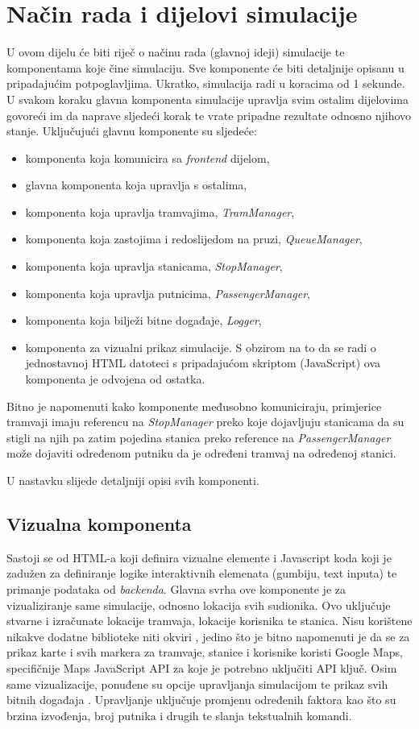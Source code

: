 \documentclass[times, utf8, diplomski]{fer}
\begin{document}
\section{Način rada i dijelovi simulacije}
U ovom dijelu će biti riječ o načinu rada (glavnoj ideji) simulacije te komponentama koje čine simulaciju. Sve komponente će biti detaljnije opisanu u pripadajućim potpoglavljima.
Ukratko, simulacija radi u koracima od 1 sekunde. U svakom koraku glavna komponenta simulacije upravlja svim ostalim dijelovima govoreći im da naprave sljedeći korak te vrate pripadne rezultate odnosno njihovo stanje. Uključujući glavnu komponente su sljedeće:
\begin{itemize}
    \item komponenta koja komunicira sa \emph{frontend} dijelom,
    \item glavna komponenta koja upravlja s ostalima,
    \item komponenta koja upravlja tramvajima, \emph{TramManager},
    \item komponenta koja zastojima i redoslijedom na pruzi, \emph{QueueManager},
    \item komponenta koja upravlja stanicama, \emph{StopManager},
    \item komponenta koja upravlja putnicima, \emph{PassengerManager},
    \item komponenta koja bilježi bitne događaje, \emph{Logger},
    \item komponenta za vizualni prikaz simulacije. S obzirom na to da se radi o jednostavnoj HTML datoteci s pripadajućom skriptom (JavaScript) ova komponenta je odvojena od ostatka.
\end{itemize}


Bitno je napomenuti kako komponente međusobno komuniciraju, primjerice tramvaji imaju referencu na \emph{StopManager} preko koje dojavljuju stanicama da su stigli na njih pa zatim pojedina stanica preko reference na \emph{PassengerManager} može dojaviti određenom putniku da je određeni tramvaj na određenoj stanici.


U nastavku slijede detaljniji opisi svih komponenti.

\subsection{Vizualna komponenta}
Sastoji se od HTML-a koji definira vizualne elemente i Javascript koda koji je zadužen za definiranje logike interaktivnih elemenata (gumbiju, text inputa) te primanje podataka od \emph{backenda}. Glavna svrha ove komponente je za vizualiziranje same simulacije, odnosno lokacija svih sudionika. Ovo uključuje stvarne i izračunate lokacije tramvaja, lokacije korisnika te stanica. Nisu korištene nikakve dodatne biblioteke niti okviri , jedino što je bitno napomenuti je da se za prikaz karte i svih markera za tramvaje, stanice i korisnike koristi Google Maps, specifičnije Maps JavaScript API za koje je potrebno uključiti API ključ. Osim same vizualizacije, ponuđene su opcije upravljanja simulacijom te prikaz svih bitnih događaja . Upravljanje uključuje promjenu određenih faktora kao što su brzina izvođenja, broj putnika i drugih te slanja tekstualnih komandi.
\end{document}
